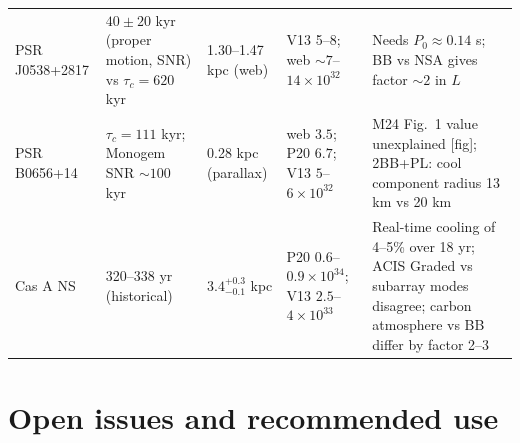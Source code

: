 \documentclass[11pt,a4paper]{article}
\newcommand{\src}[1]{\textsf{[#1]}}
\begin{document}
\begin{longtable}{P{2.3cm}P{2.9cm}P{2.9cm}P{3.0cm}P{3.2cm}}
PSR J0538+2817 & $40\pm20$ kyr (proper motion, SNR) vs $\tau_c=620$ kyr & 1.30--1.47 kpc (web) & V13 5--8; web $\sim7$--$14\times10^{32}$ & Needs $P_0\approx0.14$ s; BB vs NSA gives factor $\sim2$ in $L$ \\
PSR B0656+14 & $\tau_c=111$ kyr; Monogem SNR $\sim100$ kyr & 0.28 kpc (parallax) & web $3.5$; P20 $6.7$; V13 $5$--$6\times10^{32}$ & M24 Fig.~1 value unexplained \src{fig}; 2BB+PL: cool component radius 13 km vs 20 km \\
Cas A NS & 320--338 yr (historical) & $3.4^{+0.3}_{-0.1}$ kpc & P20 $0.6$--$0.9\times10^{34}$; V13 $2.5$--$4\times10^{33}$ & Real-time cooling of 4--5\% over 18 yr; ACIS Graded vs subarray modes disagree; carbon atmosphere vs BB differ by factor 2--3 \\
\bottomrule
\end{longtable}

\section{Open issues and recommended use}
\end{document}

